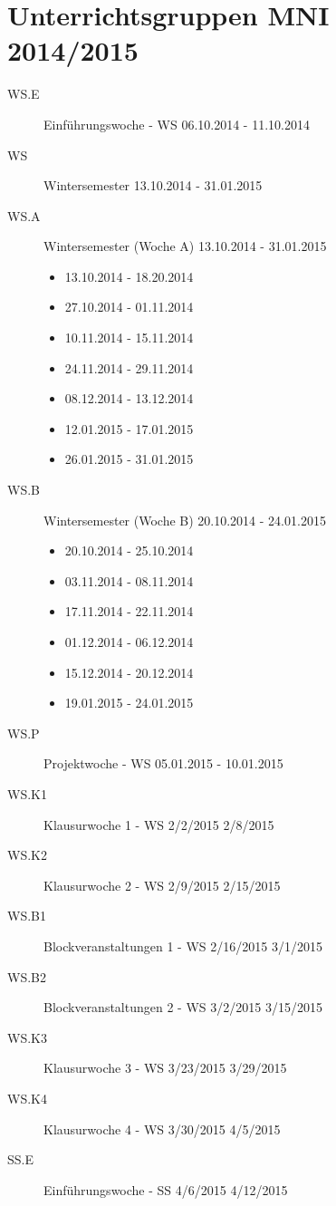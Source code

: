 
\section{Unterrichtsgruppen MNI 2014/2015}
\label{sec:unterrichtsgruppen-values}
\begin{description}
	\item[WS.E]	Einführungswoche - WS 06.10.2014 - 11.10.2014	 	 	 	
	\item[WS]	Wintersemester	13.10.2014 - 31.01.2015	
	\item[WS.A]	Wintersemester (Woche A) 13.10.2014 - 31.01.2015
		\begin{itemize}
			\item 13.10.2014 - 18.20.2014
			\item 27.10.2014 - 01.11.2014
			\item 10.11.2014 - 15.11.2014
			\item 24.11.2014 - 29.11.2014
			\item 08.12.2014 - 13.12.2014
			\item 12.01.2015 - 17.01.2015
			\item 26.01.2015 - 31.01.2015
		\end{itemize}
	\item[WS.B]	Wintersemester (Woche B) 20.10.2014 - 24.01.2015
		\begin{itemize}
			\item 20.10.2014 - 25.10.2014
			\item 03.11.2014 - 08.11.2014
			\item 17.11.2014 - 22.11.2014
			\item 01.12.2014 - 06.12.2014
			\item 15.12.2014 - 20.12.2014
			\item 19.01.2015 - 24.01.2015
		\end{itemize}
	\item[WS.P]	Projektwoche - WS 05.01.2015 - 10.01.2015	 	 	 	
	\item[WS.K1] Klausurwoche 1 - WS	2/2/2015	2/8/2015	 	 	 	
	\item[WS.K2] Klausurwoche 2 - WS	2/9/2015	2/15/2015	 	 	 	
	\item[WS.B1] Blockveranstaltungen 1 - WS	2/16/2015	3/1/2015	 	 	 	
	\item[WS.B2] Blockveranstaltungen 2 - WS	3/2/2015	3/15/2015	 	 	 	
	\item[WS.K3] Klausurwoche 3 - WS	3/23/2015	3/29/2015	 	 	 	
	\item[WS.K4] Klausurwoche 4 - WS	3/30/2015	4/5/2015	 	 	 	
	\item[SS.E]	Einführungswoche - SS	4/6/2015	4/12/2015	 	 	 	

\end{description}
